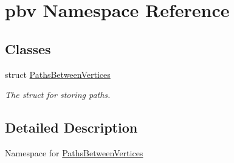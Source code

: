\hypertarget{namespacepbv}{}\section{pbv Namespace Reference}
\label{namespacepbv}
\subsection*{Classes}
\begin{DoxyCompactItemize}
\item 
struct \mbox{\hyperlink{structpbv_1_1_paths_between_vertices}{Paths\+Between\+Vertices}}
\begin{DoxyCompactList}\small\item\em The struct for storing paths. \end{DoxyCompactList}\end{DoxyCompactItemize}


\subsection{Detailed Description}
Namespace for \mbox{\hyperlink{structpbv_1_1_paths_between_vertices}{Paths\+Between\+Vertices}} 